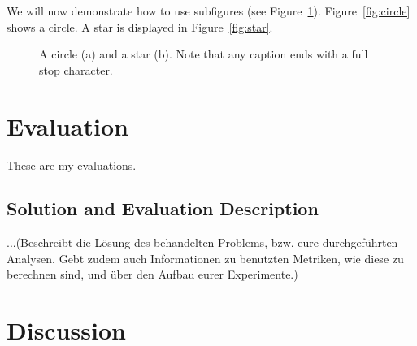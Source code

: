 \documentclass[pdftex,english,oribibl]{llncs}
\begin{document}
  We will now demonstrate how to use subfigures (see Figure~\ref{fig:subfig}). Figure~\ref{fig:circle} shows a circle. A star is displayed in Figure~\ref{fig:star}.

  \begin{figure}
    \centering
    \caption{A circle (a) and a star (b). Note that any caption ends with a full stop character.}
    \label{fig:subfig}
  \end{figure}

\section{Evaluation}\label{sec:evaluation}

  These are my evaluations.
  
  \subsection{Solution and Evaluation Description}
  
  ...(Beschreibt die Lösung des behandelten Problems, bzw. eure durchgeführten Analysen. Gebt zudem auch Informationen zu benutzten Metriken, wie diese zu berechnen sind, und über den Aufbau eurer Experimente.)
  
  
\section{Discussion}\label{sec:discussion}
\end{document}
